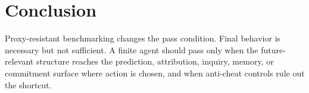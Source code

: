 \documentclass[10pt,twocolumn]{article}
\begin{document}
\section{Conclusion}

Proxy-resistant benchmarking changes the pass condition. Final behavior is
necessary but not sufficient. A finite agent should pass only when the
future-relevant structure reaches the prediction, attribution, inquiry, memory,
or commitment surface where action is chosen, and when anti-cheat controls rule
out the shortcut.




\clearpage
\onecolumn
\appendix

\end{document}
